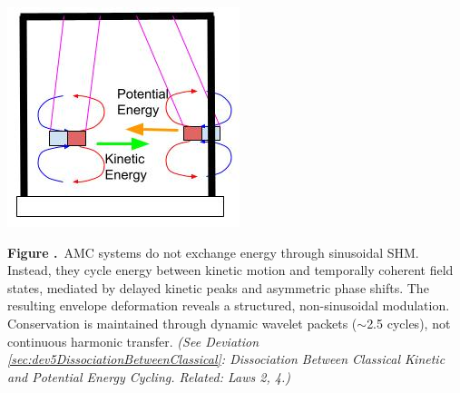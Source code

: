 \documentclass[10pt,aps,pre,onecolumn,superscriptaddress,notitlepage]{revtex4-2}
\renewcommand{\thefigure}{\arabic{figure}}
\begin{document}
\begin{center}
  \begin{minipage}[c]{0.36\linewidth}
    \includegraphics[width=\linewidth]{figures/AK1_AMC_RMI_MOTION_KINETIC_RETURN_POTENTIAL.jpg}
  \end{minipage}%
  \hfill
  \begin{minipage}[c]{0.5\linewidth}
    \textbf{Figure \thefigure.}~AMC systems do not exchange energy through sinusoidal SHM. Instead, they cycle energy between kinetic motion and temporally coherent field states, mediated by delayed kinetic peaks and asymmetric phase shifts. The resulting envelope deformation reveals a structured, non-sinusoidal modulation. Conservation is maintained through dynamic wavelet packets ($\sim$2.5 cycles), not continuous harmonic transfer. \textit{(See Deviation \ref{sec:dev5DissociationBetweenClassical}: Dissociation Between Classical Kinetic and Potential Energy Cycling. Related: Laws 2, 4.)}
    \label{fig:amc_motion_kinetic_potential}
  \end{minipage}
\end{center}
\end{document}
